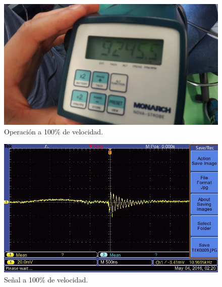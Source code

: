   \begin{figure}[!htbp]
 \centering
 \includegraphics [scale=0.2]
 {./img/9245.jpg}
  \caption{Operaci\'on a 100\% de velocidad.}
 \end{figure}

  \begin{figure}[!htbp]
 \centering
 \includegraphics [scale=0.25]
 {./img/tek0009.jpg}
  \caption{Se\~nal a 100\% de velocidad.}
 \end{figure}

\pagebreak